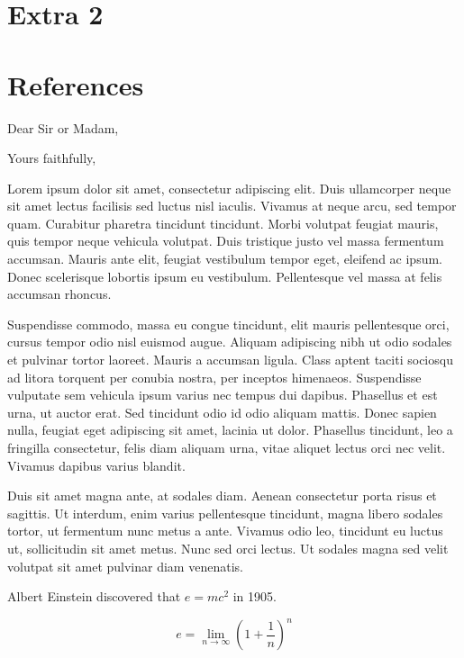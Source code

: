 \documentclass[11pt]{article}
\begin{document}
\section{Extra 2}
\label{sec:org5069cdb}
\section{References}
\label{sec:org58a77d2}
Dear Sir or Madam,

Yours faithfully,

Lorem ipsum dolor sit amet, consectetur adipiscing elit. Duis
ullamcorper neque sit amet lectus facilisis sed luctus nisl iaculis.
Vivamus at neque arcu, sed tempor quam. Curabitur pharetra tincidunt
tincidunt. Morbi volutpat feugiat mauris, quis tempor neque vehicula
volutpat. Duis tristique justo vel massa fermentum accumsan. Mauris ante
elit, feugiat vestibulum tempor eget, eleifend ac ipsum. Donec
scelerisque lobortis ipsum eu vestibulum. Pellentesque vel massa at
felis accumsan rhoncus.

Suspendisse commodo, massa eu congue tincidunt, elit mauris pellentesque
orci, cursus tempor odio nisl euismod augue. Aliquam adipiscing nibh ut
odio sodales et pulvinar tortor laoreet. Mauris a accumsan ligula. Class
aptent taciti sociosqu ad litora torquent per conubia nostra, per
inceptos himenaeos. Suspendisse vulputate sem vehicula ipsum varius nec
tempus dui dapibus. Phasellus et est urna, ut auctor erat. Sed tincidunt
odio id odio aliquam mattis. Donec sapien nulla, feugiat eget adipiscing
sit amet, lacinia ut dolor. Phasellus tincidunt, leo a fringilla
consectetur, felis diam aliquam urna, vitae aliquet lectus orci nec
velit. Vivamus dapibus varius blandit.

Duis sit amet magna ante, at sodales diam. Aenean consectetur porta
risus et sagittis. Ut interdum, enim varius pellentesque tincidunt,
magna libero sodales tortor, ut fermentum nunc metus a ante. Vivamus
odio leo, tincidunt eu luctus ut, sollicitudin sit amet metus. Nunc sed
orci lectus. Ut sodales magna sed velit volutpat sit amet pulvinar diam
venenatis.

Albert Einstein discovered that \(e=mc^2\) in 1905.

\[e=\lim_{n \to \infty} \left(1+\frac{1}{n}\right)^n\]
\end{document}
